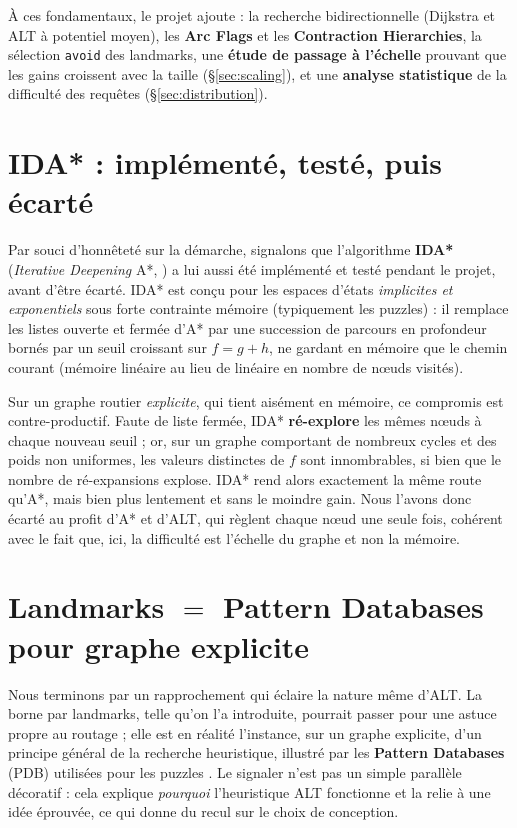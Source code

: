 À ces fondamentaux, le projet ajoute : la recherche bidirectionnelle (Dijkstra et
ALT à potentiel moyen), les \textbf{Arc Flags} et les \textbf{Contraction
Hierarchies}, la sélection \texttt{avoid} des landmarks, une \textbf{étude de
passage à l'échelle} prouvant que les gains croissent avec la taille
(\S\ref{sec:scaling}), et une \textbf{analyse statistique} de la difficulté des
requêtes (\S\ref{sec:distribution}).

\section{IDA* : implémenté, testé, puis écarté}
\label{sec:idastar}

Par souci d'honnêteté sur la démarche, signalons que l'algorithme \textbf{IDA*}
(\emph{Iterative Deepening} A*, \citealp{korf1985ida}) a lui aussi été implémenté
et testé pendant le projet, avant d'être écarté. IDA* est conçu pour les espaces d'états
\emph{implicites et exponentiels} sous forte contrainte mémoire (typiquement les
puzzles) : il remplace les listes ouverte et fermée d'A* par une succession de
parcours en profondeur bornés par un seuil croissant sur $f = g + h$, ne gardant
en mémoire que le chemin courant (mémoire linéaire au lieu de linéaire en nombre
de nœuds visités).

Sur un graphe routier \emph{explicite}, qui tient aisément en mémoire, ce
compromis est contre-productif. Faute de liste fermée, IDA* \textbf{ré-explore}
les mêmes nœuds à chaque nouveau seuil ; or, sur un graphe comportant de nombreux
cycles et des poids non uniformes, les valeurs distinctes de $f$ sont
innombrables, si bien que le nombre de ré-expansions explose. IDA* rend alors
exactement la même route qu'A*, mais bien plus lentement et sans le moindre gain.
Nous l'avons donc écarté au profit d'A* et d'ALT, qui règlent chaque nœud une
seule fois, cohérent avec le fait que, ici, la difficulté est l'échelle du
graphe et non la mémoire.

\section{Landmarks $=$ Pattern Databases pour graphe explicite}
\label{sec:pdb-alt}

Nous terminons par un rapprochement qui éclaire la nature même d'ALT. La borne
par landmarks, telle qu'on l'a introduite, pourrait passer pour une astuce
propre au routage ; elle est en réalité l'instance, sur un graphe explicite,
d'un principe général de la recherche heuristique, illustré par les
\textbf{Pattern Databases} (PDB) utilisées pour les puzzles
\citep{culberson1998pdb}. Le signaler n'est pas un simple parallèle décoratif :
cela explique \emph{pourquoi} l'heuristique ALT fonctionne et la relie à une
idée éprouvée, ce qui donne du recul sur le choix de conception.

